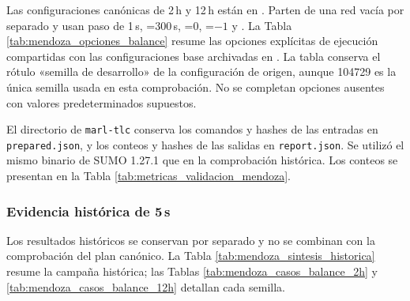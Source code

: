 Las configuraciones canónicas de 2\,h y 12\,h están en . Parten de una red vacía por separado y usan paso de 1\,s, =300\,s, =0, =$-1$ y . La Tabla \ref{tab:mendoza_opciones_balance} resume las opciones explícitas de ejecución compartidas con las configuraciones base archivadas en . La tabla conserva el rótulo «semilla de desarrollo» de la configuración de origen, aunque 104729 es la única semilla usada en esta comprobación. No se completan opciones ausentes con valores predeterminados supuestos.

\begin{table}[H]\centering\small
\caption[Opciones explícitas en la configuración canónica.]{Opciones explícitas de ejecución en las configuraciones canónicas de Mendoza, compartidas con las configuraciones base históricas de 5\,s.}\label{tab:mendoza_opciones_balance}

\end{table}

El directorio  de \texttt{marl-tlc} conserva los comandos y hashes de las entradas en \texttt{prepared.json}, y los conteos y hashes de las salidas en \texttt{report.json}. Se utilizó el mismo binario de SUMO 1.27.1 que en la comprobación histórica. Los conteos se presentan en la Tabla \ref{tab:metricas_validacion_mendoza}.

\subsubsection[Evidencia histórica de 5 s]{Evidencia histórica de 5\,s}
\label{subsec:mendoza_historico_5s}

Los resultados históricos se conservan por separado y no se combinan con la comprobación del plan canónico. La Tabla \ref{tab:mendoza_sintesis_historica} resume la campaña histórica; las Tablas \ref{tab:mendoza_casos_balance_2h} y \ref{tab:mendoza_casos_balance_12h} detallan cada semilla.

\begin{table}[H]\centering\small
\caption[Síntesis histórica de 5 s con tres semillas confirmatorias.]{Síntesis histórica de 5\,s con tres semillas confirmatorias.}\label{tab:mendoza_sintesis_historica}

\end{table}

